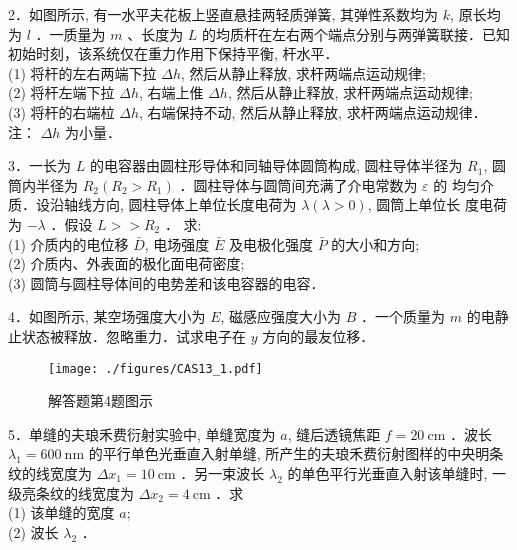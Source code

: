 2．如图所示, 有一水平夫花板上竖直悬挂两轻质弹簧, 其弹性系数均为 $k$, 原长均为 $l$ ．一质量为 $m$ 、长度为 $L$ 的均质杆在左右两个端点分别与两弹簧联接．已知初始时刻，该系统仅在重力作用下保持平衡, 杆水平．\\
(1) 将杆的左右两端下拉 $\Delta h$, 然后从静止释放, 求杆两端点运动规律;\\
(2) 将杆左端下拉 $\Delta h$, 右端上倠 $\Delta h$, 然后从静止释放, 求杆两端点运动规律;\\
(3) 将杆的右端柆 $\Delta h$, 右端保持不动, 然后从静止释放, 求杆两端点运动规律． 注： $\Delta h$ 为小量．

3．一长为 $L$ 的电容器由圆柱形导体和同轴导体圆筒构成, 圆柱导体半径为 $R_{1}$, 圆筒内半径为 $R_{2}\left(R_{2}>R_{1}\right)$ ．圆柱导体与圆筒间充满了介电常数为 $\varepsilon$ 的
均匀介质．设沿轴线方向, 圆柱导体上单位长度电荷为 $\lambda(\lambda>0)$, 圆筒上单位长 度电荷为 $-\lambda$ ．假设 $L>>R_{2}$ ． 求:\\
(1) 介质内的电位移 $\bar{D}$, 电场强度 $\bar{E}$ 及电极化强度 $\bar{P}$ 的大小和方向;\\
(2) 介质内、外表面的极化面电荷密度;\\
(3) 圆筒与圆柱导体间的电势差和该电容器的电容．

4．如图所示, 某空场强度大小为 $E$, 磁感应强度大小为 $B$ ．一个质量为 $m$ 的电静止状态被释放．忽略重力．试求电子在 $y$ 方向的最友位移．
\begin{figure}[ht]
\centering
\texttt{[image: ./figures/CAS13\_1.pdf]}
\caption{解答题第4题图示} \label{CAS13_fig1}
\end{figure}
5．单缝的夫琅禾费衍射实验中, 单缝宽度为 $a$, 缝后透镜焦距 $f=20 \mathrm{~cm}$ ．波长 $\lambda_1= 600 \mathrm{~nm}$ 的平行单色光垂直入射单缝, 所产生的夫琅禾费衍射图样的中央明条纹的线宽度为 $\Delta x_{1}=10 \mathrm{~cm}$ ．另一束波长 $\lambda_{2}$ 的单色平行光垂直入射该单缝时, 一级亮条纹的线宽度为 $\Delta x_{2}=4 \mathrm{~cm}$ ．求\\
(1) 该单缝的宽度 $a$;\\
(2) 波长 $\lambda_{2}$ ．